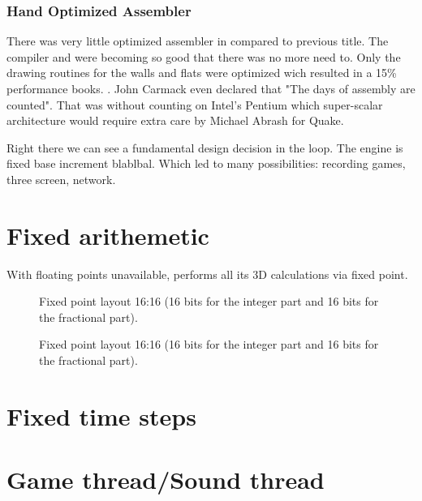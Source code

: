 \par


\subsubsection{Hand Optimized Assembler}
There was very little optimized assembler in \doom compared to previous title. The compiler and  were becoming so good that there was no more need to. Only the drawing routines for the walls and flats were optimized wich resulted in a 15\% performance books. . John Carmack even declared that "The days of assembly are counted". That was without counting on Intel's Pentium which super-scalar architecture would require extra care by Michael Abrash for Quake.



Right there we can see a fundamental design decision in the loop. The engine is fixed base increment blablbal. Which led to many possibilities: recording games, three screen, network.

\section{Fixed arithemetic}
With floating points unavailable, \doom performs all its 3D calculations via fixed point.\\
\par
{}
\begin{figure}[H]
 \centering
  
 \caption{Fixed point layout 16:16 (16 bits for the integer part and 16 bits for the fractional part).} \label{fig:mips}
\end{figure}

\begin{figure}[H]
 \centering
  
 \caption{Fixed point layout 16:16 (16 bits for the integer part and 16 bits for the fractional part).} \label{fig:mips}
\end{figure}

\section{Fixed time steps}

\section{Game thread/Sound thread}
